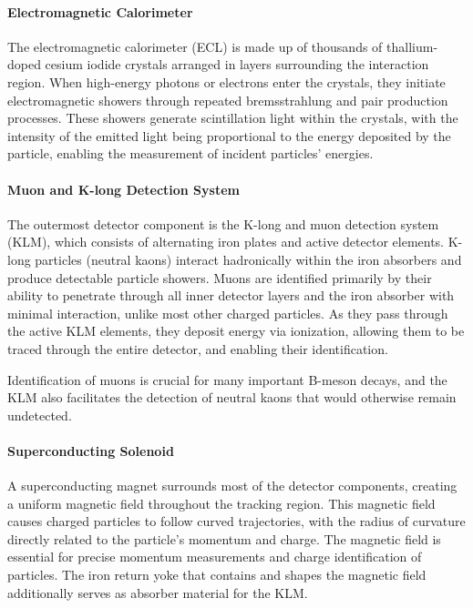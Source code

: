 \paragraph{Electromagnetic Calorimeter}
The electromagnetic calorimeter (ECL) is made up of thousands of thallium-doped cesium iodide crystals arranged in layers surrounding the interaction region.
When high-energy photons or electrons enter the crystals, they initiate electromagnetic showers through repeated bremsstrahlung and pair production processes.
These showers generate scintillation light within the crystals, with the intensity of the emitted light being proportional to the energy deposited by the particle, enabling the measurement of incident particles' energies.

\paragraph{Muon and K-long Detection System}
The outermost detector component is the K-long and muon detection system (KLM), which consists of alternating iron plates and active detector elements.
K-long particles (neutral kaons) interact hadronically within the iron absorbers and produce detectable particle showers.
Muons are identified primarily by their ability to penetrate through all inner detector layers and the iron absorber with minimal interaction, unlike most other charged particles.
As they pass through the active KLM elements, they deposit energy via ionization, allowing them to be traced through the entire detector, and enabling their identification.

Identification of muons is crucial for many important B-meson decays, and the KLM also facilitates the detection of neutral kaons that would otherwise remain undetected.

\paragraph{Superconducting Solenoid}
A superconducting magnet surrounds most of the detector components, creating a uniform magnetic field throughout the tracking region.
This magnetic field causes charged particles to follow curved trajectories, with the radius of curvature directly related to the particle's momentum and charge.
The magnetic field is essential for precise momentum measurements and charge identification of particles.
The iron return yoke that contains and shapes the magnetic field additionally serves as absorber material for the KLM.

